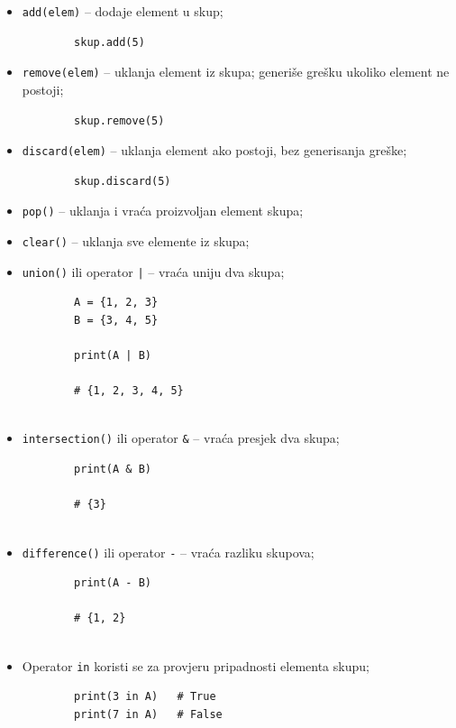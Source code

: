 \begin{itemize}
	
	\item \texttt{add(elem)} -- dodaje element u skup;
	
	\begin{verbatim}
		skup.add(5)
	\end{verbatim}
	
	\item \texttt{remove(elem)} -- uklanja element iz skupa; generiše grešku ukoliko element ne postoji;
	
	\begin{verbatim}
		skup.remove(5)
	\end{verbatim}
	
	\item \texttt{discard(elem)} -- uklanja element ako postoji, bez generisanja greške;
	
	\begin{verbatim}
		skup.discard(5)
	\end{verbatim}
	
	\item \texttt{pop()} -- uklanja i vraća proizvoljan element skupa;
	
	\item \texttt{clear()} -- uklanja sve elemente iz skupa;
	
	\item \texttt{union()} ili operator \texttt{|} -- vraća uniju dva skupa;
	
	\begin{verbatim}
		A = {1, 2, 3}
		B = {3, 4, 5}
		
		print(A | B)
		
		# {1, 2, 3, 4, 5}
		
	\end{verbatim}
	
	\item \texttt{intersection()} ili operator \texttt{\&} -- vraća presjek dva skupa;
	
	\begin{verbatim}
		print(A & B)
		
		# {3}
		
	\end{verbatim}
	
	\item \texttt{difference()} ili operator \texttt{-} -- vraća razliku skupova;
	
	\begin{verbatim}
		print(A - B)
		
		# {1, 2}
		
	\end{verbatim}
	
	\item Operator \texttt{in} koristi se za provjeru pripadnosti elementa skupu;
	
	\begin{verbatim}
		print(3 in A)   # True
		print(7 in A)   # False
	\end{verbatim}
	
\end{itemize}

